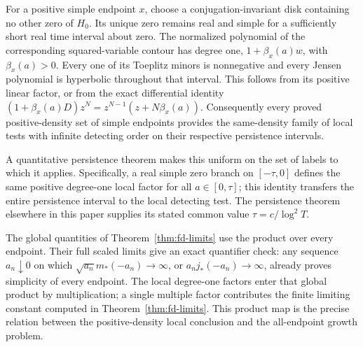 For a positive simple endpoint $x$, choose a conjugation-invariant disk
containing no other zero of $H_0$.  Its unique zero remains real and
simple for a sufficiently short real time interval about zero.
The normalized polynomial of the corresponding squared-variable
contour has degree one, $1+\beta_x(a)w$, with $\beta_x(a)>0$.
Every one of its Toeplitz minors is nonnegative and every Jensen
polynomial is hyperbolic throughout that interval.  This follows
from its positive linear factor, or from the exact differential
identity $(1+\beta_x(a)D)z^N=z^{N-1}(z+N\beta_x(a))$.
Consequently every proved positive-density set of simple endpoints
provides the same-density family of local tests with infinite detecting
order on their respective persistence intervals.

A quantitative persistence theorem makes this uniform on the set of
labels to which it applies.  Specifically, a real simple zero branch
on $[-\tau,0]$ defines the same positive degree-one local factor for
all $a\in[0,\tau]$; this identity transfers the entire persistence
interval to the local detecting test.  The persistence theorem elsewhere
in this paper supplies its stated common value $\tau=c/\log^2T$.

The global quantities of Theorem~\ref{thm:fd-limits} use the product
over every endpoint.  Their full scaled limits give an exact quantifier
check: any sequence $a_n\downarrow0$ on which
$\sqrt{a_n}m_*(-a_n)\to\infty$, or
$a_nj_*(-a_n)\to\infty$, already proves simplicity of every endpoint.
The local degree-one factors enter that global product by multiplication;
a single multiple factor contributes the finite limiting constant
computed in Theorem~\ref{thm:fd-limits}.  This product map is the
precise relation between the positive-density local conclusion and
the all-endpoint growth problem.
